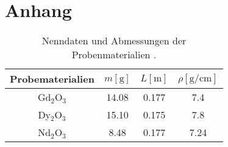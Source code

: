 \section{Anhang}


\begin{table}
    \caption{Nenndaten und Abmessungen der Probenmaterialien \cite{skript}.}
    \centering
    \label{tab:proben}
    \begin{tabular}{c || c c c}
        \toprule
        \tiny Probematerialien & $m [\si{\gram}]$ & $L [\si{\meter}]$ & $\rho [\si{\gram\per\centi\meter}] $\\
        \midrule
        Gd$_2$O$_3$ & 14.08 & 0.177 & 7.4 \\
        \midrule
        Dy$_2$O$_3$ & 15.10 & 0.175 & 7.8 \\
        \midrule
        Nd$_2$O$_3$ & 8.48  & 0.177 & 7.24 \\
        \bottomrule    
    \end{tabular}
\end{table}

